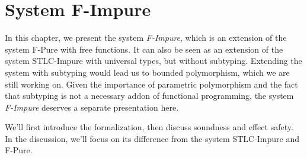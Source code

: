 \section{System F-Impure}

In this chapter, we present the system \emph{F-Impure}, which is an
extension of the system F-Pure with free functions. It can also be
seen as an extension of the system STLC-Impure with universal types,
but without subtyping. Extending the system with subtyping would lead
us to bounded polymorphism, which we are still working on. Given the
importance of parametric polymorphism and the fact that subtyping is
not a necessary addon of functional programming, the system
\emph{F-Impure} deserves a separate presentation here.

We'll first introduce the formalization, then discuss soundness and
effect safety. In the discussion, we'll focus on its difference from
the system STLC-Impure and F-Pure.

